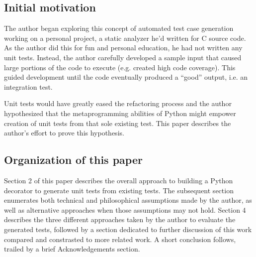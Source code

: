 \subsection{Initial motivation}\label{sec:intro-4}

The author began exploring this concept of automated test case generation
working on a personal project, a static analyzer he'd written for C source code.  As the
author did this for fun and personal education, he had not written any unit
tests.  Instead, the author carefully developed a sample input that caused large
portions of the code to execute (e.g. created high code coverage).  This guided
development until the code eventually produced a “good” output, i.e. an integration
test.
  
Unit tests would have greatly eased the refactoring process and the author 
hypothesized that the metaprogramming abilities of Python might empower creation
of unit tests from that sole existing test. This paper describes the author's
effort to prove this hypothesis.

\subsection{Organization of this paper}\label{sec:intro-5}

Section 2 of this paper describes the overall approach to building a
Python decorator to generate unit tests from existing tests. The subsequent
section enumerates both technical and philosophical assumptions made by the
author, as well as alternative approaches when those assumptions may not hold.
Section 4 describes the three different approaches taken by the author to 
evaluate the generated tests, followed by a section dedicated to further 
discussion of this work compared and constrasted to more related work.  A short
conclusion follows, trailed by a brief Acknowledgements section.

